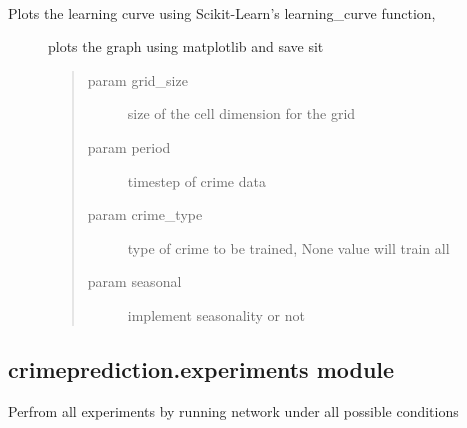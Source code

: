 \documentclass[letterpaper,10pt,english]{sphinxmanual}
\begin{document}

\begin{fulllineitems}
\label{api/crimeprediction:crimeprediction.error_analysis.plot_learning_curve}~\begin{description}
\item[{Plots the learning curve using Scikit-Learn's learning\_curve function,}] \leavevmode
plots the graph using matplotlib and save sit
\begin{quote}\begin{description}
\item[{param grid\_size}] \leavevmode
size of the cell dimension for the grid

\item[{param period}] \leavevmode
timestep of crime data

\item[{param crime\_type}] \leavevmode
type of crime to be trained, None value will
train all

\item[{param seasonal}] \leavevmode
implement seasonality or not

\end{description}\end{quote}

\end{description}

\end{fulllineitems}



\subsection{crimeprediction.experiments module}
\label{api/crimeprediction:crimeprediction-experiments-module}\label{api/crimeprediction:module-crimeprediction.experiments}

\begin{fulllineitems}
\label{api/crimeprediction:crimeprediction.experiments.run_experiments}
Perfrom all experiments by running network under all possible conditions

\end{fulllineitems}
\end{document}
